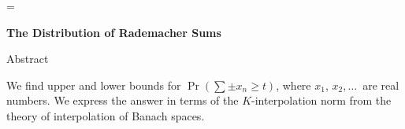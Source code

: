 \magnification=
\baselineskip =5.5mm
\lineskiplimit =1.0mm
\lineskip =1.0mm

\def\sqr{\vcenter {\hrule height.3mm
\hbox {\vrule width.3mm height 2mm \kern2mm
\vrule width.3mm } \hrule height.3mm }}

\def\Proof:{\medskip\noindent{\bf Proof:}\ \ \ }
\def\endproof{\hfill$\sqr$\medskip}

\def\Bbb{\bf}
\def\N{{\Bbb N}}

\def\ds#1{{\displaystyle{#1}}}
\def\ts#1{{\textstyle{#1}}}

\def\list#1{#1_1$, $#1_2,\ldots}
\def\lists#1,#2{#1_1$, $#1_2,\ldots,$\ $#1_{#2}}
\def\xlist{\list x}
\def\epsilonlist{\list\varepsilon}
\def\gammalist{\list\gamma}

\def\seqo#1{(#1_n)_{n=1}^\infty}
\def\seqx{\seqo x}

\def\recipo#1{{1\over #1}}
\def\smallrecipo#1{\ts{\recipo{#1}}}
\def\half{{\recipo2}}
\def\smallhalf{\smallrecipo2}
\def\smallthird{\smallrecipo3}

\def\invo#1{#1^{-1}}
\def\invc{\invo c}

\def\modo#1{\left| #1 \right|}
\def\modxn{\modo{x_n}}

\def\normo#1{\left\| #1 \right\|}
\def\normx{\normo x}

\def\sumt{\sum_{m=1}^t}
\def\sumtt{\sum_{m=1}^{t^2}}
\def\sumBm{\sum_{n\in B_m}}
\def\sumnm{\sum_{n=n_m+1}^{n_{m+1}}}

\def\rmss_#1^#2#3{\left(\sum_{#1}^{#2} #3^2\right)^\half}
\def\rms#1{\rmss_{}^{}{#1}}
\def\rmsBm#1{\rmss_{n\in B_m}^{}{#1}}
\def\rmsnm#1{\rmss_{n=n_{m-1}+1}^{n_m}{#1}}

\def\Kotto#1{K_{1,2}(#1,t)}
\def\Jitto#1{J_{\infty,2}(#1,t)}
\def\Jitinvto#1{J_{\infty,2}(#1,\invo t)}
\def\Kottx{\Kotto x}
\def\Jittx{\Jitto x}
\def\Jitinvtx{\Jitinvto x}


\def\Pt{{P(t)}}
\def\Ptt{{P(t^2)}}

\def\Prepsilon#1{\Pr\left(\sum \varepsilon_n x_n > #1 \right)}
\def\Prgamma#1{\Pr\left(\sum \gamma_n x_n > #1 \right)}

\centerline{\bf The Distribution of Rademacher Sums}

\bigskip
\centerline{\vbox{}}
\bigskip

\beginsection Abstract

We find upper and lower bounds for $\Pr\left(\sum \pm x_n \ge t\right)$,
where $\xlist$\ are real numbers. We express the answer in terms of the
$K$-interpolation norm from the theory of interpolation of Banach spaces.

